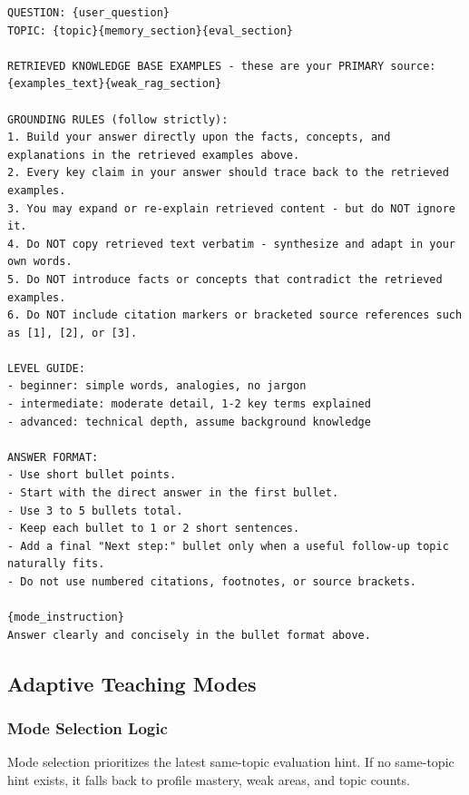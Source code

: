 \documentclass[11pt,a4paper]{article}
\begin{document}
\begin{lstlisting}
QUESTION: {user_question}
TOPIC: {topic}{memory_section}{eval_section}

RETRIEVED KNOWLEDGE BASE EXAMPLES - these are your PRIMARY source:
{examples_text}{weak_rag_section}

GROUNDING RULES (follow strictly):
1. Build your answer directly upon the facts, concepts, and explanations in the retrieved examples above.
2. Every key claim in your answer should trace back to the retrieved examples.
3. You may expand or re-explain retrieved content - but do NOT ignore it.
4. Do NOT copy retrieved text verbatim - synthesize and adapt in your own words.
5. Do NOT introduce facts or concepts that contradict the retrieved examples.
6. Do NOT include citation markers or bracketed source references such as [1], [2], or [3].

LEVEL GUIDE:
- beginner: simple words, analogies, no jargon
- intermediate: moderate detail, 1-2 key terms explained
- advanced: technical depth, assume background knowledge

ANSWER FORMAT:
- Use short bullet points.
- Start with the direct answer in the first bullet.
- Use 3 to 5 bullets total.
- Keep each bullet to 1 or 2 short sentences.
- Add a final "Next step:" bullet only when a useful follow-up topic naturally fits.
- Do not use numbered citations, footnotes, or source brackets.

{mode_instruction}
Answer clearly and concisely in the bullet format above.
\end{lstlisting}

\subsection{Adaptive Teaching Modes}

\subsubsection{Mode Selection Logic}

Mode selection prioritizes the latest same-topic evaluation hint. If no same-topic hint exists, it falls back to profile mastery, weak areas, and topic counts.
\end{document}
